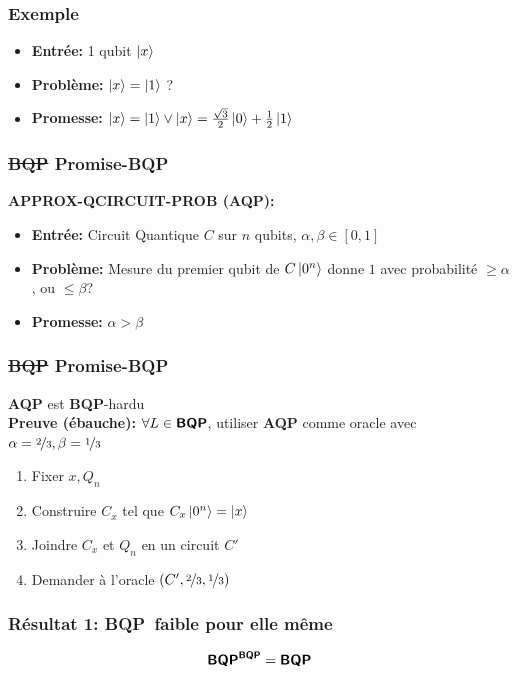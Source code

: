 \documentclass{beamer}
\newcommand{\bqp}{\textsf{\textbf{BQP}}}
\begin{document}
\begin{frame}
  \frametitle{Exemple}

  \begin{itemize}
    \item \textbf{Entr\'ee:} 1 qubit $\ket{x}$
    \item \textbf{Probl\`eme:} $\ket{x} = \ket{1}$ ? \pause
    \item \textbf{Promesse:} $\ket{x} = \ket{1} \lor \ket{x} = \frac{\sqrt{3}}{2} \ket{0} + \frac{1}{2} \ket{1}$
  \end{itemize}
\end{frame}

\begin{frame}
  \frametitle{\sout{\bqp} Promise-\bqp}

  \textbf{APPROX-QCIRCUIT-PROB (AQP):}
  \begin{itemize}
    \item \textbf{Entr\'ee:} Circuit Quantique $C$ sur $n$ qubits, $\alpha, \beta \in [0,1]$ \pause
    \item \textbf{Probl\`eme:} Mesure du premier qubit de $C\ket{0^n}$ donne $1$ avec probabilit\'e $\geq \alpha$, ou $\leq \beta$? \pause
    \item \textbf{Promesse:} $\alpha > \beta$
  \end{itemize}

\end{frame}

\begin{frame}
  \frametitle{\sout{\bqp} Promise-\bqp}

  \textbf{AQP} est \bqp-hardu\\
  \textbf{Preuve (\'ebauche):}
  $\forall L \in \bqp$, utiliser \textbf{AQP} comme oracle avec $\alpha=\nicefrac{2}{3}, \beta=\nicefrac{1}{3}$
  \begin{enumerate}
    \item Fixer $x, Q_n$
    \item Construire $C_x$ tel que $C_x \ket{0^n}=\ket{x}$
    \item Joindre $C_x$ et $Q_n$ en un circuit $C'$
    \item Demander \`a l'oracle $(C', \nicefrac{2}{3}, \nicefrac{1}{3})$
  \end{enumerate}

\end{frame}

\begin{frame}
  \frametitle{R\'esultat 1: \bqp \ faible pour elle m\^eme}

  \[\bqp^{\bqp} = \bqp\]
\end{frame}
\end{document}
